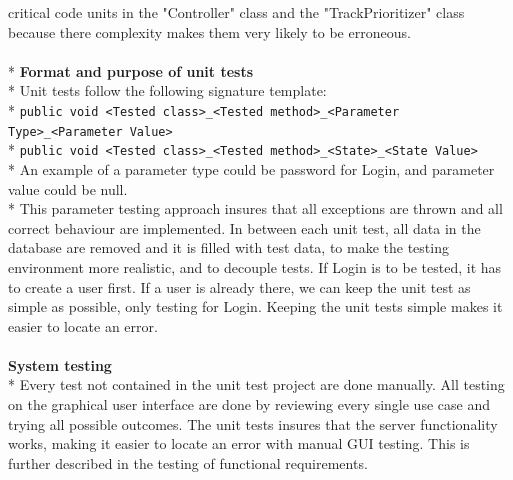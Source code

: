 \documentclass[a4paper,11pt,report]{article}
\begin{document}
{critical code units in the "Controller" class and the "TrackPrioritizer" class because there complexity makes them very likely to be erroneous.\\ \\*
\textbf{Format and purpose of unit tests}\\*
Unit tests follow the following signature template:
\\*
\verb|public void <Tested class>_<Tested method>_<Parameter Type>_<Parameter Value>|
\\*
\verb|public void <Tested class>_<Tested method>_<State>_<State Value>|
\\*
An example of a parameter type could be password for Login, and parameter value could be null. \\*
This parameter testing approach insures that all exceptions are thrown and all correct behaviour are implemented. In between each unit test, all data in the database are removed and it is filled with test data, to make the testing environment more realistic, and to decouple tests. If Login is to be tested, it has to create a user first. If a user is already there, we can keep the unit test as simple as possible, only testing for Login. Keeping the unit tests simple makes it easier to locate an error. \\ \\
\textbf{System testing}\\*
Every test not contained in the unit test project are done manually. All testing on the graphical user interface are done by reviewing every single use case and trying all possible outcomes. The unit tests insures that the server functionality works, making it easier to locate an error with manual GUI testing. This is further described in the testing of functional requirements.

}
\end{document}

